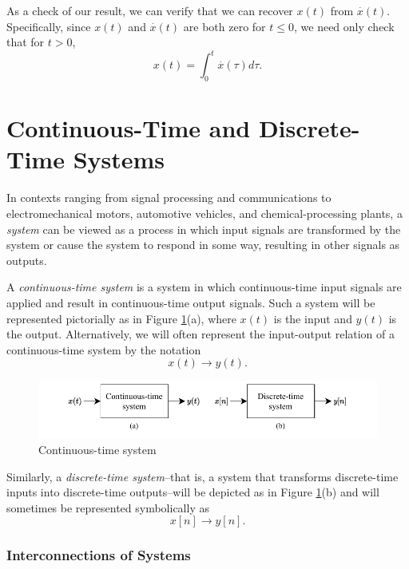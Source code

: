 \documentclass[a4paper,10pt,twoside]{book}
\begin{document}
As a check of our result, we can verify that we can recover $x(t)$ from $\overset{\cdot}{x}(t)$. Specifically, since $x(t)$ and $\overset{\cdot}{x}(t)$ are both zero for $t\le 0$, we need only check that for $t>0$,
\begin{equation}
    x(t)=\int_0^t\overset{\cdot}{x}(\tau)d\tau.
    \label{1.77}
\end{equation}

\section{Continuous-Time and Discrete-Time Systems}

In contexts ranging from signal processing and communications to electromechanical motors, automotive vehicles, and chemical-processing plants, a \textit{system} can be viewed as a process in which input signals are transformed by the system or cause the system to respond in some way, resulting in other signals as outputs.

A \textit{continuous-time system} is a system in which continuous-time input signals are applied and result in continuous-time output signals. Such a system will be represented pictorially as in Figure \ref{Fig2}(a), where $x(t)$ is the input and $y(t)$ is the output. Alternatively, we will often represent the input-output relation of a continuous-time system by the notation
\begin{equation}
    x(t)\to y(t).
    \label{1.78}
\end{equation}

\begin{figure}[htbp]
    \centering
    \includegraphics[width=\linewidth]{Fig2.pdf}
    \caption{Continuous-time system}
    \label{Fig2}
\end{figure}

Similarly, a \textit{discrete-time system}--that is, a system that transforms discrete-time inputs into discrete-time outputs--will be depicted as in Figure \ref{Fig2}(b) and will sometimes be represented symbolically as
\begin{equation}
    x[n]\to y[n].
    \label{1.79}
\end{equation}

\subsubsection{Interconnections of Systems}
\end{document}
